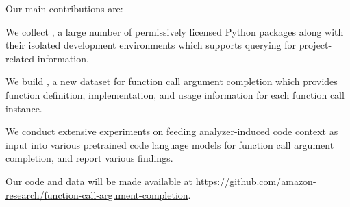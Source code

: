 Our main contributions are:
\begin{enumerate*}[label=\itshape\roman*\upshape)]
    \item We collect \PyEnvs, a large number of permissively licensed Python packages along with their isolated development environments which supports querying for project-related information. 
    \item We build \CallArgs, a new dataset for function call argument completion which provides function definition, implementation, and usage information for each function call instance.
    \item We conduct extensive experiments on feeding analyzer-induced code context as input into various pretrained code language models for function call argument completion, and report various findings.
\end{enumerate*}
Our code and data will be made available at \url{https://github.com/amazon-research/function-call-argument-completion}.


